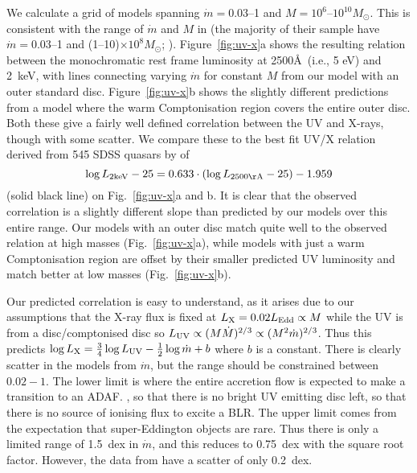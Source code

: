 \documentclass[a4paper,fleqn,usenatbib]{mnras}
\begin{document}
We calculate a grid of models spanning $\dot{m}=0.03$--1 and
$M=10^6$--$10^{10}M_\odot$. 
This is consistent with the range of $\dot{m}$ and $M$ in \cite{lusso2017} 
(the majority of their sample have $\dot{m}=0.03$--1 and (1--10)$\times 10^8M_\odot$; \citealt{lusso2012}). 
Figure~\ref{fig:uv-x}a shows the resulting relation between the
monochromatic rest frame luminosity at 2500\AA~(i.e., 5 eV) and 2~keV, with lines
connecting varying $\dot{m}$ for constant $M$ from our model
with an outer standard disc. 
Figure~\ref{fig:uv-x}b shows the slightly different predictions from a
model where the warm Comptonisation region covers the entire outer
disc. Both these give a fairly well defined correlation 
between the UV and X-rays, though with some scatter. 
We compare these to
the best fit UV/X relation derived from 545 SDSS quasars by
\cite{lusso2017} of
\begin{equation}
\log L_{\rm 2keV}-25=0.633 \cdot (\log L_{\rm 2500 \AA}-25)-1.959
\end{equation}
(solid black line) on Fig.~\ref{fig:uv-x}a and b. It is clear that 
the observed correlation is a slightly different slope than predicted
by our models over this entire range. Our models with an outer disc match quite well to the observed relation at
high masses (Fig.~\ref{fig:uv-x}a), while models with just a warm Comptonisation region are
offset by their smaller predicted UV luminosity and match better at
low masses (Fig.~\ref{fig:uv-x}b). 

Our predicted correlation is easy to understand, as it 
arises due to our assumptions that the X-ray flux is fixed at
$L_{\rm X}=0.02L_{\rm Edd}\propto M$ while the UV is from a disc/comptonised
disc so $L_{\rm UV}\propto (M\dot{M})^{2/3}\propto (M^2\dot{m})^{2/3}$.
Thus this predicts $\log L_{\rm X}=\frac{3}{4}\log L_{\rm UV} -
\frac{1}{2}\log\dot{m}+b$ where $b$ is a constant. There is clearly
scatter in the models from $\dot{m}$, but the range should be 
constrained between $0.02-1$. 
The lower limit is where the 
entire accretion flow
is expected to make a transition to an ADAF. \cite{narayan1995}, so that there is no bright UV 
emitting disc left, so that there is no source of ionising flux to excite a BLR.
The upper limit comes from the expectation that 
super-Eddington objects are rare.
Thus there is only a limited range of 1.5~dex in $\dot{m}$, and
this reduces to 0.75~dex with the square root factor. However, the
data from \cite{lusso2017} have a scatter of only 0.2~dex.
\end{document}

